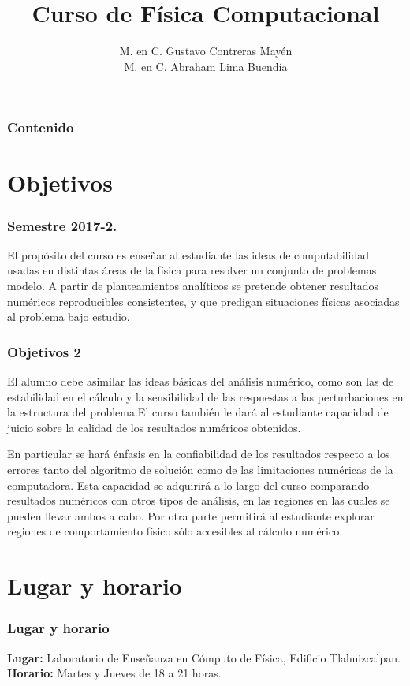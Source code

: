 \documentclass[12pt]{beamer}
\title{Curso de Física Computacional}
\author[]{M. en C. Gustavo Contreras Mayén \\ M. en C. Abraham Lima Buendía}
\date{ }
\begin{document}
\maketitle
\fontsize{14}{14}\selectfont
{}
\begin{frame}
\frametitle{Contenido}
\tableofcontents[pausesections]
\end{frame}
\section{Objetivos}
\begin{frame}
\frametitle{Semestre 2017-2.}
El propósito del curso es enseñar al estudiante las ideas de computabilidad usadas en distintas áreas de la  física para resolver un conjunto de problemas modelo. A partir de planteamientos analíticos se pretende obtener resultados numéricos reproducibles consistentes, y que predigan situaciones físicas asociadas al problema bajo estudio.
\end{frame}
\begin{frame}
\frametitle{Objetivos 2}
El alumno debe asimilar las ideas básicas del análisis numérico, como son las de estabilidad en el cálculo y la sensibilidad de las respuestas a las perturbaciones en la estructura del problema.El curso también le dará al estudiante capacidad de juicio sobre la calidad de los resultados numéricos obtenidos.
\end{frame}
\begin{frame}
En particular se hará énfasis en la confiabilidad de los resultados respecto a los errores tanto del algoritmo de solución como de las limitaciones numéricas de la computadora. Esta capacidad se adquirirá a lo largo del curso comparando resultados numéricos con otros tipos de análisis, en las regiones en las cuales se pueden llevar ambos a cabo. Por otra parte permitirá al estudiante explorar regiones de comportamiento físico sólo accesibles al cálculo numérico.
\end{frame}
\section{Lugar y horario}
\begin{frame}
\frametitle{Lugar y horario} 
\textbf{Lugar: }Laboratorio de Enseñanza en Cómputo de Física, Edificio Tlahuizcalpan.
\\
\bigskip
\textbf{Horario: } Martes y Jueves de 18 a 21 horas.
\end{frame}
\end{document}
